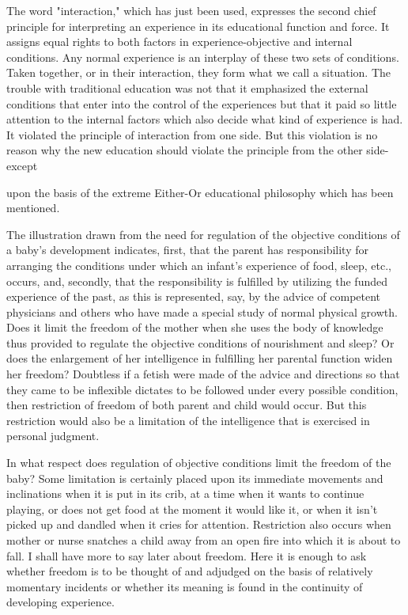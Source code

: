 The word "interaction," which has just been used, expresses the second chief principle 
for interpreting an experience in its educational function and force. It assigns equal rights 
to both factors in experience-objective and internal conditions. Any normal experience is 
an interplay of these two sets of conditions. Taken together, or in their interaction, they 
form what we call a situation. The trouble with traditional education was not that it 
emphasized the external conditions that enter into the control of the experiences but that 
it paid so little attention to the internal factors which also decide what kind of experience 
is had. It violated the principle of interaction from one side. But this violation is no 
reason why the new education should violate the principle from the other side-except 



upon the basis of the extreme Either-Or educational philosophy which has been 
mentioned. 

The illustration drawn from the need for regulation of the objective conditions of a 
baby's development indicates, first, that the parent has responsibility for arranging the 
conditions under which an infant's experience of food, sleep, etc., occurs, and, secondly, 
that the responsibility is fulfilled by utilizing the funded experience of the past, as this is 
represented, say, by the advice of competent physicians and others who have made a 
special study of normal physical growth. Does it limit the freedom of the mother when 
she uses the body of knowledge thus provided to regulate the objective conditions of 
nourishment and sleep? Or does the enlargement of her intelligence in fulfilling her 
parental function widen her freedom? Doubtless if a fetish were made of the advice and 
directions so that they came to be inflexible dictates to be followed under every possible 
condition, then restriction of freedom of both parent and child would occur. But this 
restriction would also be a limitation of the intelligence that is exercised in personal 
judgment. 

In what respect does regulation of objective conditions limit the freedom of the baby? 
Some limitation is certainly placed upon its immediate movements and inclinations when 
it is put in its crib, at a time when it wants to continue playing, or does not get food at the 
moment it would like it, or when it isn't picked up and dandled when it cries for attention. 
Restriction also occurs when mother or nurse snatches a child away from an open fire 
into which it is about to fall. I shall have more to say later about freedom. Here it is 
enough to ask whether freedom is to be thought of and adjudged on the basis of relatively 
momentary incidents or whether its meaning is found in the continuity of developing 
experience. 

